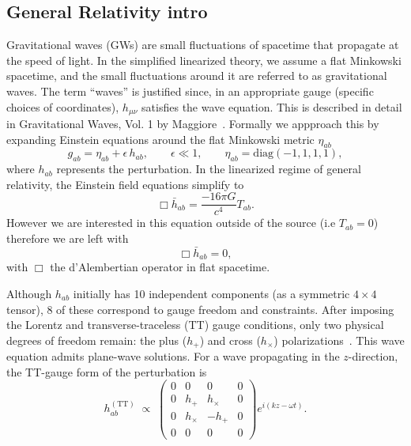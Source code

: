 \documentclass[10pt]{article}
\begin{document}
\subsection{General Relativity intro}
\label{sec:GRintro}
Gravitational waves (GWs) are small fluctuations of spacetime that propagate at the speed of light. In the simplified linearized theory, we assume a flat Minkowski spacetime, and the small fluctuations around it are referred to as gravitational waves. The term ``waves'' is justified since, in an appropriate gauge (specific choices of coordinates), \(h_{\mu\nu}\) satisfies the wave equation. This is described in detail in Gravitational Waves, Vol. 1 by Maggiore~\cite[Sec~ 1.1]{GRbook}.
Formally we appproach this by expanding Einstein equations around the flat Minkowski metric $\eta _{a b}$ 
\begin{equation}
g_{ab} = \eta_{ab} + \epsilon\,h_{ab},
\qquad
\epsilon \ll 1,
\qquad
\eta_{ab} = \mathrm{diag}(-1, 1, 1, 1),
\end{equation}
where \(h_{ab}\) represents the perturbation. In the linearized regime of general relativity, the Einstein field equations simplify to
\begin{equation}
    \Box \bar{h}_{ab} = \frac{-16\pi G}{c^4} T_{ab}.
\end{equation}
However we are interested in this equation outside of the source (i.e $T_{ab} =0$) therefore we are left with 
\begin{equation}
    \Box \bar{h}_{ab} = 0, 
\end{equation}
with \(\Box\) the d’Alembertian operator in flat spacetime.
%

Although \(h_{ab}\) initially has 10 independent components (as a symmetric $4 \times 4$ tensor), 8 of these correspond to gauge freedom and constraints. After imposing the Lorentz and transverse-traceless (TT) gauge conditions, only two physical degrees of freedom remain: the plus (\(h_+\)) and cross (\(h_\times\)) polarizations~\cite[Sec.~1.2]{GRbook}.
This wave equation admits plane-wave solutions. For a wave propagating in the \(z\)-direction, the TT-gauge form of the perturbation is
\begin{equation}
h_{ab}^{(\mathrm{TT})} \;\propto\;
\begin{pmatrix}
0 & 0 & 0 & 0 \\
0 & h_+ & h_\times & 0 \\
0 & h_\times & -h_+ & 0 \\
0 & 0 & 0 & 0
\end{pmatrix}
e^{i(kz-\omega t)}.
\end{equation}
\end{document}
